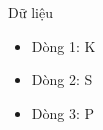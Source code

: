 Dữ liệu
\begin{itemize}
	\item     Dòng 1: K   
	\item     Dòng 2: S   
	\item     Dòng 3: P   
\end{itemize}